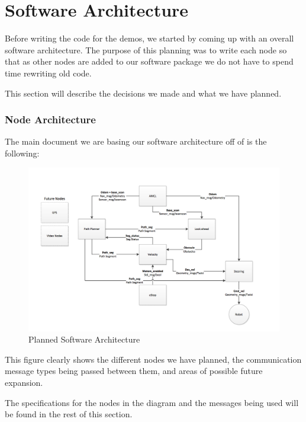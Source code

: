 \part{Software Architecture}

Before writing the code for the demos, we started by coming up with an
overall software architecture.  The purpose of this planning was to
write each node so that as other nodes are added to our software
package we do not have to spend time rewriting old code.

This section will describe the decisions we made and what we have
planned.

\section{Node Architecture}

The main document we are basing our software architecture off of is
the following:

\begin{figure}[h]
  \includegraphics[width=8.0in]{software_architecture_diagram}
  \caption{Planned Software Architecture}
\end{figure}

This figure clearly shows the different nodes we have planned, the
communication message types being passed between them, and areas of
possible future expansion.

The specifications for the nodes in the diagram and the messages being
used will be found in the rest of this section.

